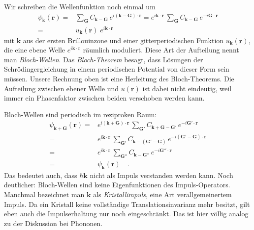 Wir schreiben die Wellenfunktion noch einmal um
\begin{eqnarray}
    \psi_\mathbf{k}(\mathbf{r}) = & \sum_{\mathbf{G}} C_{\mathbf{k}-\mathbf{G}} \, e^{i (\mathbf{k}- \mathbf{G}) \cdot \mathbf{r} }
    = e^{i \mathbf{k} \cdot \mathbf{r} } \,
    \sum_{\mathbf{G}} C_{\mathbf{k}-\mathbf{G}} \, e^{-i \mathbf{G} \cdot \mathbf{r} } \\
    = & u_\mathbf{k}(\mathbf{r}) \; e^{i \mathbf{k} \cdot \mathbf{r} } 
\end{eqnarray}
mit $\mathbf{k}$ aus der ersten Brillouinzone und  einer gitterperiodischen Funktion $u_\mathbf{k}(\mathbf{r})$, die eine ebene Welle $e^{i \mathbf{k} \cdot \mathbf{r} }$ räumlich moduliert. Diese Art der Aufteilung nennt man \emph{Bloch-Wellen}. Das \emph{Bloch-Theorem} besagt, dass Lösungen der Schrödingergleichung in einem periodischen Potential von dieser Form sein müssen. Unsere Rechnung oben ist eine Herleitung des Bloch-Theorems. Die Aufteilung zwischen ebener Welle und $u(\mathbf{r})$ ist dabei nicht eindeutig, weil immer ein Phasenfaktor zwischen beiden verschoben werden kann.




Bloch-Wellen sind periodisch im reziproken Raum:
\begin{eqnarray}
    \psi_{\mathbf{k} + \mathbf{G}}(\mathbf{r}) = & 
     e^{i (\mathbf{k} + \mathbf{G}) \cdot \mathbf{r} } \, \sum_{\mathbf{G}'} C_{\mathbf{k} +  \mathbf{G} -\mathbf{G}'} \, e^{-i \mathbf{G}' \cdot \mathbf{r} } \\
     = &  e^{i \mathbf{k}  \cdot \mathbf{r} } \, \sum_{\mathbf{G}'} C_{\mathbf{k} - (\mathbf{G}' -\mathbf{G})} \, e^{-i (\mathbf{G}' - \mathbf{G}) \cdot \mathbf{r} } \\
     = &  e^{i \mathbf{k}  \cdot \mathbf{r} } \, \sum_{\mathbf{G}''} C_{\mathbf{k} - \mathbf{G}''} \, e^{-i \mathbf{G}''   \cdot \mathbf{r} } \\
 = &  \psi_{\mathbf{k}}(\mathbf{r})  \quad .
    \end{eqnarray}
Das bedeutet auch, dass $\hbar \mathbf{k}$ nicht als Impuls verstanden werden kann. Noch deutlicher: Bloch-Wellen sind keine Eigenfunktionen des Impuls-Operators. Manchmal bezeichnet man  $\mathbf{k}$ als \emph{Kristallimpuls}, eine Art verallgemeinertem Impuls. Da ein Kristall keine vollständige Translationsinvarianz mehr besitzt, gilt eben auch die Impulserhaltung nur noch eingeschränkt. Das ist hier völlig analog zu der Diskussion bei Phononen. 




